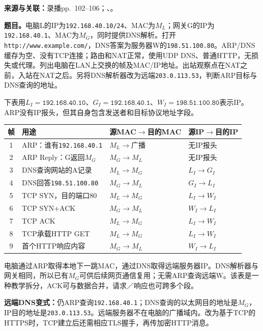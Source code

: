 \textbf{来源与关联：}录播pp.~102--106；、。
\nopagebreak[4]

\textbf{题目。}电脑L的IP为\texttt{192.168.40.10/24}、MAC为$M_L$；网关G的IP为\texttt{192.168.40.1}、MAC为$M_G$，同时提供DNS解析。打开\texttt{http://www.example.com/}，DNS答案为服务器W的\texttt{198.51.100.80}。ARP/DNS缓存为空、没有TCP连接；路由和NAT正常，使用UDP DNS、普通HTTP，无损失或代理。列出电脑在LAN上交换的帧及MAC/IP地址。出站观察点在NAT之前，入站在NAT之后。另将DNS解析器改为远端\texttt{203.0.113.53}，判断ARP目标与DNS查询的地址。

\begin{workedsolution}
下表用$L_I=\texttt{192.168.40.10}$、$G_I=\texttt{192.168.40.1}$、$W_I=\texttt{198.51.100.80}$表示IP。ARP没有IP报头，但其自身包含发送者和目标协议地址字段。
\begin{center}
\small
\begin{tabularx}{\textwidth}{@{}cp{5.5cm}XX@{}}
\toprule
帧 & 用途 & 源MAC$\to$目的MAC & 源IP$\to$目的IP \\
\midrule
1 & ARP：谁有\texttt{192.168.40.1} & $M_L\to$广播 & 无IP报头 \\
2 & ARP Reply：G返回$M_G$ & $M_G\to M_L$ & 无IP报头 \\
3 & DNS查询网站的A记录 & $M_L\to M_G$ & $L_I\to G_I$ \\
4 & DNS回答\texttt{198.51.100.80} & $M_G\to M_L$ & $G_I\to L_I$ \\
5 & TCP SYN，目的端口80 & $M_L\to M_G$ & $L_I\to W_I$ \\
6 & TCP SYN+ACK & $M_G\to M_L$ & $W_I\to L_I$ \\
7 & TCP ACK & $M_L\to M_G$ & $L_I\to W_I$ \\
8 & TCP承载HTTP GET & $M_L\to M_G$ & $L_I\to W_I$ \\
9 & 首个HTTP响应内容 & $M_G\to M_L$ & $W_I\to L_I$ \\
\bottomrule
\end{tabularx}
\end{center}
电脑通过ARP取得本地下一跳MAC，通过DNS取得远端服务器IP。DNS解析器与网关相同，所以已有$M_G$可供后续网页通信复用；无需ARP查询远端W。该表是一种教学拆分，ACK可与数据合并，请求／响应也可跨多个段。

\textbf{远端DNS变式：}仍ARP查询\texttt{192.168.40.1}；DNS查询的以太网目的地址是$M_G$，IP目的地址是\texttt{203.0.113.53}。远端服务器不在电脑的广播域内。改为基于TCP的HTTPS时，TCP建立后还需相应TLS握手，再传加密HTTP消息。
\end{workedsolution}

